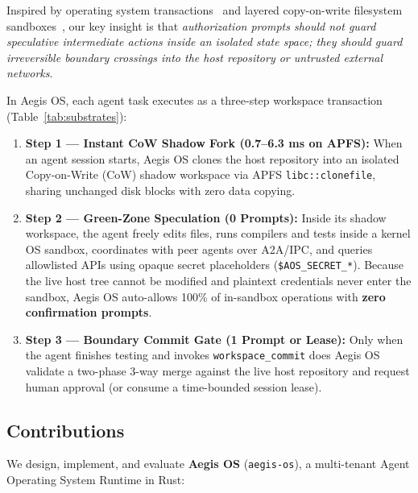 \documentclass[10pt,twocolumn]{article}
\begin{document}
Inspired by operating system transactions~\cite{porter2009txos,nightingale2005speculator} and layered copy-on-write filesystem sandboxes~\cite{kim2013mbox,wright2004unionfs}, our key insight is that \emph{authorization prompts should not guard speculative intermediate actions inside an isolated state space; they should guard irreversible boundary crossings into the host repository or untrusted external networks}.

In Aegis OS, each agent task executes as a three-step workspace transaction (Table~\ref{tab:substrates}):
\begin{enumerate}
    \item \textbf{Step 1 --- Instant CoW Shadow Fork (0.7--6.3 ms on APFS):} When an agent session starts, Aegis OS clones the host repository into an isolated Copy-on-Write (CoW) shadow workspace via APFS \texttt{libc::clonefile}, sharing unchanged disk blocks with zero data copying.
    \item \textbf{Step 2 --- Green-Zone Speculation (0 Prompts):} Inside its shadow workspace, the agent freely edits files, runs compilers and tests inside a kernel OS sandbox, coordinates with peer agents over A2A/IPC, and queries allowlisted APIs using opaque secret placeholders (\texttt{\$AOS\_SECRET\_*}). Because the live host tree cannot be modified and plaintext credentials never enter the sandbox, Aegis OS auto-allows 100\% of in-sandbox operations with \textbf{zero confirmation prompts}.
    \item \textbf{Step 3 --- Boundary Commit Gate (1 Prompt or Lease):} Only when the agent finishes testing and invokes \texttt{workspace\_commit} does Aegis OS validate a two-phase 3-way merge against the live host repository and request human approval (or consume a time-bounded session lease).
\end{enumerate}

\subsection{Contributions}

We design, implement, and evaluate \textbf{Aegis OS} (\texttt{aegis-os}), a multi-tenant Agent Operating System Runtime in Rust:
\end{document}
